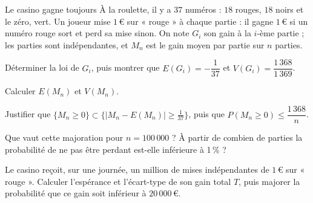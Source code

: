 \begin{exercice}[3]{Le casino gagne toujours}
À la roulette, il y a $37$ numéros : $18$ rouges, $18$ noirs et le zéro, vert. Un joueur mise $1$\,€ sur « rouge » à chaque partie :
il gagne $1$\,€ si un numéro rouge sort et perd sa mise sinon. On note $G_i$ son gain à la $i$-ème partie ; les parties sont
indépendantes, et $M_n$ est le gain moyen par partie sur $n$ parties.
\begin{questions}
  \item Déterminer la loi de $G_i$, puis montrer que $E(G_i)=-\dfrac1{37}$ et $V(G_i)=\dfrac{1\,368}{1\,369}$.
  \item Calculer $E(M_n)$ et $V(M_n)$.
  \item Justifier que $\big\{M_n\geq0\big\}\subset\Big\{\big|M_n-E(M_n)\big|\geq\frac1{37}\Big\}$, puis que $P(M_n\geq0)\leq\dfrac{1\,368}{n}$.
  \item Que vaut cette majoration pour $n=100\,000$ ? À partir de combien de parties la probabilité de ne pas être perdant est-elle
    inférieure à 1\,\% ?
  \item Le casino reçoit, sur une journée, un million de mises indépendantes de $1$\,€ sur « rouge ». Calculer l'espérance et
    l'écart-type de son gain total $T$, puis majorer la probabilité que ce gain soit inférieur à $20\,000$\,€.
\end{questions}
\end{exercice}
